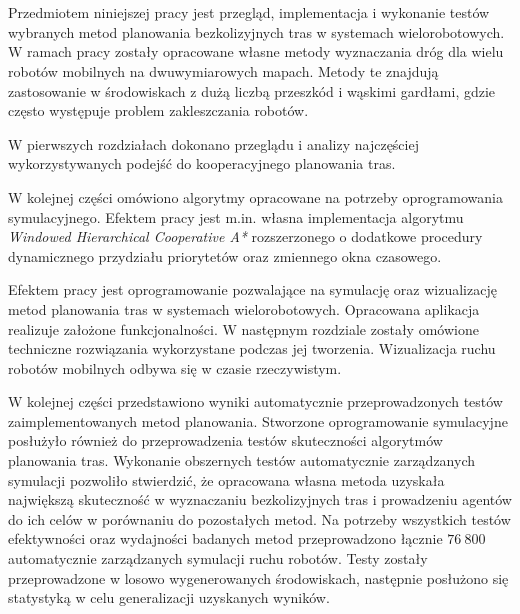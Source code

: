 \\

\\

\begin{singlespacing}

Przedmiotem niniejszej pracy jest przegląd, implementacja i wykonanie testów wybranych metod planowania bezkolizyjnych tras w systemach wielorobotowych.
W ramach pracy zostały opracowane własne metody wyznaczania dróg dla wielu robotów mobilnych na dwuwymiarowych mapach.
Metody te znajdują zastosowanie w środowiskach z dużą liczbą przeszkód i wąskimi gardłami, gdzie często występuje problem zakleszczania robotów.

W pierwszych rozdziałach dokonano przeglądu i analizy najczęściej wykorzystywanych podejść do kooperacyjnego planowania tras.

W kolejnej części omówiono algorytmy opracowane na potrzeby oprogramowania symulacyjnego.
Efektem pracy jest m.in. własna implementacja algorytmu {\it Windowed Hierarchical Cooperative A*} rozszerzonego o dodatkowe procedury dynamicznego przydziału priorytetów oraz zmiennego okna czasowego.

Efektem pracy jest oprogramowanie pozwalające na symulację oraz wizualizację metod planowania tras w systemach wielorobotowych.
Opracowana aplikacja realizuje założone funkcjonalności.
W następnym rozdziale zostały omówione techniczne rozwiązania wykorzystane podczas jej tworzenia.
Wizualizacja ruchu robotów mobilnych odbywa się w czasie rzeczywistym.

W kolejnej części przedstawiono wyniki automatycznie przeprowadzonych testów zaimplementowanych metod planowania.
Stworzone oprogramowanie symulacyjne posłużyło również do przeprowadzenia testów skuteczności algorytmów planowania tras.
Wykonanie obszernych testów automatycznie zarządzanych symulacji pozwoliło stwierdzić, że opracowana własna metoda uzyskała największą skuteczność w wyznaczaniu bezkolizyjnych tras i prowadzeniu agentów do ich celów w porównaniu do pozostałych metod.
Na potrzeby wszystkich testów efektywności oraz wydajności badanych metod przeprowadzono łącznie $76\ 800$ automatycznie zarządzanych symulacji ruchu robotów.
Testy zostały przeprowadzone w losowo wygenerowanych środowiskach, następnie posłużono się statystyką w celu generalizacji uzyskanych wyników.



\end{singlespacing}
